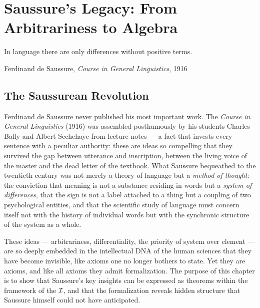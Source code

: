 
\chapter{Saussure's Legacy: From Arbitrariness to Algebra}
\label{ch:saussure}

\epigraph{In language there are only differences without positive terms.}{Ferdinand de Saussure, \textit{Course in General Linguistics}, 1916}

\section{The Saussurean Revolution}

Ferdinand de Saussure never published his most important work. The
\textit{Course in General Linguistics} (1916) was assembled posthumously
by his students Charles Bally and Albert Sechehaye from lecture notes
--- a fact that invests every sentence with a peculiar authority: these
are ideas so compelling that they survived the gap between utterance
and inscription, between the living voice of the master and the dead
letter of the textbook. What Saussure bequeathed to the twentieth
century was not merely a theory of language but a \emph{method of
thought}: the conviction that meaning is not a substance residing in
words but a \emph{system of differences}, that the sign is not a label
attached to a thing but a coupling of two psychological entities, and
that the scientific study of language must concern itself not with the
history of individual words but with the synchronic structure of the
system as a whole.

These ideas --- arbitrariness, differentiality, the priority of system
over element --- are so deeply embedded in the intellectual DNA of the
human sciences that they have become invisible, like axioms one no
longer bothers to state. Yet they are axioms, and like all axioms they
admit formalization. The purpose of this chapter is to show that
Saussure's key insights can be expressed as theorems within the
framework of the $\mathcal{I}$, and that the formalization reveals hidden
structure that Saussure himself could not have anticipated.

